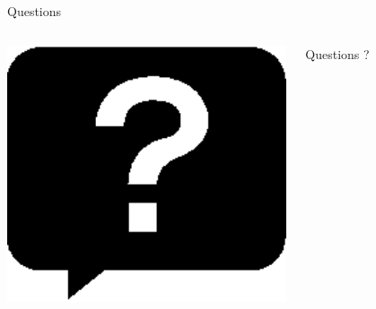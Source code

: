 \documentclass[compress, 12pt]{beamer}
\begin{document}
\begin{frame}{Questions}
    \begin{columns}
        \begin{column}{.2\textwidth}
            \includegraphics[width=1.3\textwidth]{./pix/sym_question}
        \end{column}
        \begin{column}{.6\textwidth}
            \begin{center}
                \huge Questions ?
            \end{center}
        \end{column}
    \end{columns}
\end{frame}
\end{document}
